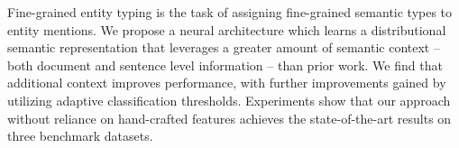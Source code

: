 Fine-grained entity typing is the task of assigning fine-grained semantic types to  entity mentions. We propose a neural architecture which learns a distributional semantic representation that leverages a greater amount of semantic context -- both document and sentence level information -- than prior work.  We find that additional context improves performance, with further improvements gained by utilizing adaptive classification thresholds. Experiments show that our approach without reliance on hand-crafted features achieves the state-of-the-art results on three benchmark datasets.
